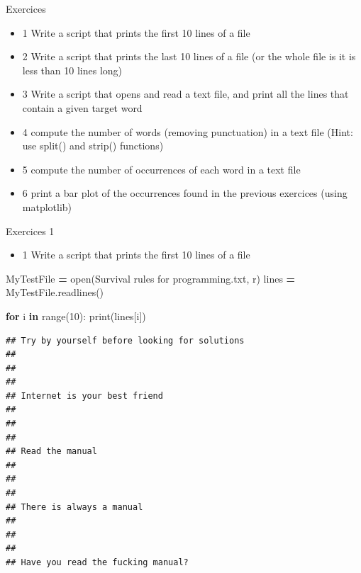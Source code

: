 \documentclass[
  8pt,
  ignorenonframetext,
]{beamer}
\newenvironment{Shaded}{\begin{snugshade}}{\end{snugshade}}
\newcommand{\BuiltInTok}[1]{#1}
\newcommand{\ControlFlowTok}[1]{\textcolor[rgb]{0.13,0.29,0.53}{\textbf{#1}}}
\newcommand{\DecValTok}[1]{\textcolor[rgb]{0.00,0.00,0.81}{#1}}
\newcommand{\KeywordTok}[1]{\textcolor[rgb]{0.13,0.29,0.53}{\textbf{#1}}}
\newcommand{\NormalTok}[1]{#1}
\newcommand{\OperatorTok}[1]{\textcolor[rgb]{0.81,0.36,0.00}{\textbf{#1}}}
\newcommand{\StringTok}[1]{\textcolor[rgb]{0.31,0.60,0.02}{#1}}
\providecommand{\tightlist}{%
  \setlength{\itemsep}{0pt}\setlength{\parskip}{0pt}}
\begin{document}
\begin{frame}{Exercices}
\protect\hypertarget{exercices}{}
\begin{itemize}
\tightlist
\item
  1 Write a script that prints the first 10 lines of a file
\item
  2 Write a script that prints the last 10 lines of a file (or the whole
  file is it is less than 10 lines long)
\item
  3 Write a script that opens and read a text file, and print all the
  lines that contain a given target word
\item
  4 compute the number of words (removing punctuation) in a text file
  (Hint: use split() and strip() functions)
\item
  5 compute the number of occurrences of each word in a text file
\item
  6 print a bar plot of the occurrences found in the previous exercices
  (using matplotlib)
\end{itemize}
\end{frame}

\begin{frame}[fragile]{Exercices 1}
\protect\hypertarget{exercices-1}{}
\begin{itemize}
\tightlist
\item
  1 Write a script that prints the first 10 lines of a file
\end{itemize}

\begin{Shaded}
\begin{Highlighting}[]
\NormalTok{MyTestFile }\OperatorTok{=} \BuiltInTok{open}\NormalTok{(}\StringTok{\textquotesingle{}Survival rules for programming.txt\textquotesingle{}}\NormalTok{, }\StringTok{\textquotesingle{}r\textquotesingle{}}\NormalTok{)}
\NormalTok{lines }\OperatorTok{=}\NormalTok{ MyTestFile.readlines()}

\ControlFlowTok{for}\NormalTok{ i }\KeywordTok{in} \BuiltInTok{range}\NormalTok{(}\DecValTok{10}\NormalTok{):}
  \BuiltInTok{print}\NormalTok{(lines[i])}
\end{Highlighting}
\end{Shaded}

\begin{verbatim}
## Try by yourself before looking for solutions
## 
## 
## 
## Internet is your best friend
## 
## 
## 
## Read the manual
## 
## 
## 
## There is always a manual
## 
## 
## 
## Have you read the fucking manual?
\end{verbatim}
\end{frame}
\end{document}

